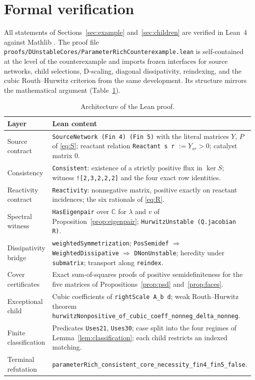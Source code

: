 \documentclass[11pt,a4paper]{article}
\theoremstyle{definition}
\theoremstyle{remark}
\newcommand{\C}{\mathbb{C}}
\newcommand{\lean}[1]{\texttt{#1}}
\begin{document}
\section{Formal verification}\label{sec:lean}

All statements of Sections~\ref{sec:example} and~\ref{sec:children} are verified in Lean~4 \cite{Lean4} against Mathlib \cite{Mathlib}. The proof file \lean{proofs/DUnstableCores/ParameterRichCounterexample.lean} is self-contained at the level of the counterexample and imports frozen interfaces for source networks, child selections, D-scaling, diagonal dissipativity, reindexing, and the cubic Routh--Hurwitz criterion from the same development. Its structure mirrors the mathematical argument (Table~\ref{tab:lean}).

\begin{table}[ht]
\centering
\small
\begin{tabular}{@{}p{}p{}@{}}
\toprule
Layer & Lean content\\
\midrule
Source contract & \lean{SourceNetwork (Fin 4) (Fin 5)} with the literal matrices $Y$, $P$ of \eqref{eq:S}; reactant relation \lean{Reactant s r} $:=Y_{sr}>0$; catalyst matrix $0$.\\
Consistency & \lean{Consistent}: existence of a strictly positive flux in $\ker S$; witness \lean{![2,3,2,2,2]} and the four exact row identities.\\
Reactivity contract & \lean{Reactivity}: nonnegative matrix, positive exactly on reactant incidences; the six rationals of \eqref{eq:R}.\\
Spectral witness & \lean{HasEigenpair} over $\C$ for $\lambda$ and $v$ of Proposition~\ref{prop:eigenpair}; \lean{HurwitzUnstable (Q.jacobian R)}.\\
Dissipativity bridge & \lean{weightedSymmetrization}; \lean{PosSemidef} $\Rightarrow$ \lean{WeightedDissipative} $\Rightarrow$ \lean{DNonUnstable}; heredity under \lean{submatrix}; transport along \lean{reindex}.\\
Cover certificates & Exact sum-of-squares proofs of positive semidefiniteness for the five matrices of Propositions~\ref{prop:psd} and~\ref{prop:faces}.\\
Exceptional child & Cubic coefficients of \lean{rightScale A\_b d}; weak Routh--Hurwitz theorem \lean{hurwitzNonpositive\_of\_cubic\_coeff\_nonneg\_delta\_nonneg}.\\
Finite classification & Predicates \lean{Uses21}, \lean{Uses30}; case split into the four regimes of Lemma~\ref{lem:classification}; each child restricts an indexed matching.\\
Terminal refutation & \lean{parameterRich\_consistent\_core\_necessity\_fin4\_fin5\_false}.\\
\bottomrule
\end{tabular}
\caption{Architecture of the Lean proof.}\label{tab:lean}
\end{table}
\end{document}
